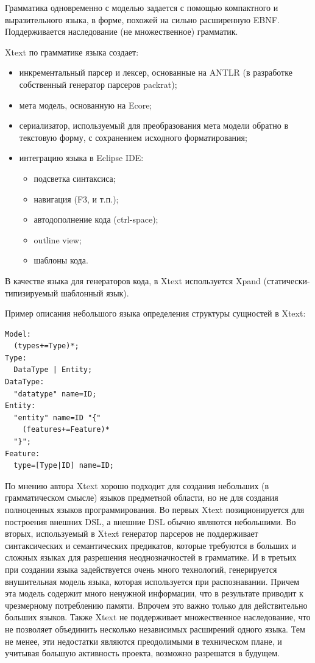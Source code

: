\documentclass[a4paper,12pt,titlepage]{extarticle}
\begin{document}
Грамматика одновременно с моделью задается с помощью компактного и
выразительного языка, в форме, похожей на сильно расширенную EBNF.
Поддерживается наследование (не множественное) грамматик.

Xtext по грамматике языка создает:
\begin{itemize}
  \item инкрементальный парсер и лексер, основанные на ANTLR (в разработке
  собственный генератор парсеров packrat);
  \item мета модель, основанную на Ecore;
  \item сериализатор, используемый для преобразования мета модели обратно в
  текстовую форму, с сохранением исходного форматирования; 
  \item интеграцию языка в Eclipse IDE:
  \begin{itemize}
    \item подсветка синтаксиса;
    \item навигация (F3, и т.п.);
    \item автодополнение кода (ctrl-space);
    \item outline view;
    \item шаблоны кода.
  \end{itemize}
\end{itemize}

В качестве языка для генераторов кода, в Xtext используется Xpand
(статически-типизируемый шаблонный язык).

Пример описания небольшого языка определения структуры сущностей в Xtext:
\begin{verbatim}
Model:
  (types+=Type)*;
Type:
  DataType | Entity;
DataType:
  "datatype" name=ID;
Entity:
  "entity" name=ID "{"
    (features+=Feature)* 
  "}";
Feature:
  type=[Type|ID] name=ID;   
\end{verbatim}

По мнению автора Xtext хорошо подходит для создания небольших (в грамматическом
смысле) языков предметной области, но не для создания полноценных языков
программирования. Во первых Xtext позиционируется для построения внешних DSL, а внешние DSL обычно
являются небольшими. Во вторых, используемый в Xtext генератор парсеров не
поддерживает синтаксических и семантических предикатов, которые требуются в
больших и сложных языках для разрешения неоднозначностей в грамматике. И в
третьих при создании языка задействуется очень много технологий, генерируется
внушительная модель языка, которая используется при распознавании. Причем эта
модель содержит много ненужной информации, что в результате приводит к
чрезмерному потреблению памяти. Впрочем это важно только для действительно
больших языков.
Также Xtext не поддерживает множественное наследование, что не позволяет
объединить несколько независимых расширений одного языка.
Тем не менее, эти недостатки являются преодолимыми в техническом плане, и
учитывая большую активность проекта, возможно разрешатся в будущем.
\end{document}

